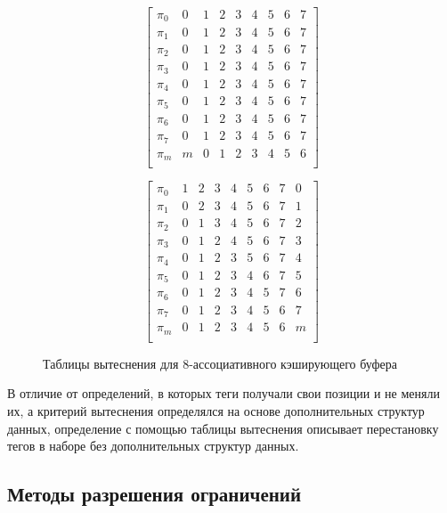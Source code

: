 \begin{figure}[h] \centering
\parbox{0.4\textwidth}{
$$ \left[
     \begin{array}{c|cccccccc}
       \pi_0 & 0 & 1 & 2 & 3 & 4 & 5 & 6 & 7 \\
       \pi_1 & 0 & 1 & 2 & 3 & 4 & 5 & 6 & 7 \\
       \pi_2 & 0 & 1 & 2 & 3 & 4 & 5 & 6 & 7 \\
       \pi_3 & 0 & 1 & 2 & 3 & 4 & 5 & 6 & 7 \\
       \pi_4 & 0 & 1 & 2 & 3 & 4 & 5 & 6 & 7 \\
       \pi_5 & 0 & 1 & 2 & 3 & 4 & 5 & 6 & 7 \\
       \pi_6 & 0 & 1 & 2 & 3 & 4 & 5 & 6 & 7 \\
       \pi_7 & 0 & 1 & 2 & 3 & 4 & 5 & 6 & 7 \\
       \pi_m & m & 0 & 1 & 2 & 3 & 4 & 5 & 6 \\
     \end{array}
   \right]$$
\center \FIFO} \qquad
\parbox{0.4\textwidth}{
$$ \left[
     \begin{array}{c|cccccccc}
       \pi_0 & 1 & 2 & 3 & 4 & 5 & 6 & 7 & 0 \\
       \pi_1 & 0 & 2 & 3 & 4 & 5 & 6 & 7 & 1 \\
       \pi_2 & 0 & 1 & 3 & 4 & 5 & 6 & 7 & 2 \\
       \pi_3 & 0 & 1 & 2 & 4 & 5 & 6 & 7 & 3 \\
       \pi_4 & 0 & 1 & 2 & 3 & 5 & 6 & 7 & 4 \\
       \pi_5 & 0 & 1 & 2 & 3 & 4 & 6 & 7 & 5 \\
       \pi_6 & 0 & 1 & 2 & 3 & 4 & 5 & 7 & 6 \\
       \pi_7 & 0 & 1 & 2 & 3 & 4 & 5 & 6 & 7 \\
       \pi_m & 0 & 1 & 2 & 3 & 4 & 5 & 6 & m \\
     \end{array}
   \right]$$
\center \MRU } \caption{Таблицы вытеснения для 8-ассоциативного
кэширующего буфера}\label{fig:fifo_mru_tables}
\end{figure}

В отличие от определений, в которых теги получали свои позиции и не
меняли их, а критерий вытеснения определялся на основе
дополнительных структур данных, определение с помощью таблицы
вытеснения описывает перестановку тегов в наборе без дополнительных
структур данных.

\subsection{Методы разрешения ограничений}

